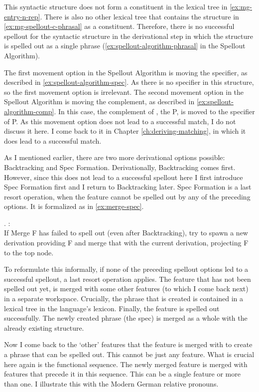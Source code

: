 This syntactic structure does not form a constituent in the lexical tree in \ref{ex:mg-entry-n-rep}. There is also no other lexical tree that contains the structure in \ref{ex:mg-spellout-c-phrasal} as a constituent. Therefore, there is no successful spellout for the syntactic structure in the derivational step in which the structure is spelled out as a single phrase (\ref{ex:spellout-algorithm-phrasal} in the Spellout Algorithm).

The first movement option in the Spellout Algorithm is moving the specifier, as described in \ref{ex:spellout-algorithm-spec}. As there is no specifier in this structure, so the first movement option is irrelevant.
The second movement option in the Spellout Algorithm is moving the complement, as described in \ref{ex:spellout-algorithm-comp}. In this case, the complement of , the P, is moved to the specifier of P. As this movement option does not lead to a successful match, I do not discuss it here. I come back to it in Chapter \ref{ch:deriving-matching}, in which it does lead to a successful match.

As I mentioned earlier, there are two more derivational options possible: Backtracking and Spec Formation. Derivationally, Backtracking comes first. However, since this does not lead to a successful spellout here I first introduce Spec Formation first and I return to Backtracking later. Spec Formation is a last resort operation, when the feature cannot be spelled out by any of the preceding options. It is formalized as in \ref{ex:merge-spec}.

\ex.\label{ex:merge-spec}
 \citep{starke2018}:\\
If Merge F has failed to spell out (even after Backtracking), try to spawn a new derivation providing F and merge that with the current derivation, projecting F to the top node.

To reformulate this informally, if none of the preceding spellout options led to a successful spellout, a last resort operation applies. The feature that has not been spelled out yet, is merged with some other features (to which I come back next) in a separate workspace. Crucially, the phrase that is created is contained in a lexical tree in the language's lexicon. Finally, the feature is spelled out successfully. The newly created phrase (the spec) is merged as a whole with the already existing structure.

Now I come back to the `other' features that the feature is merged with to create a phrase that can be spelled out. This cannot be just any feature. What is crucial here again is the functional sequence. The newly merged feature is merged with features that precede it in this sequence. This can be a single feature or more than one. I illustrate this with the Modern German relative pronouns.

